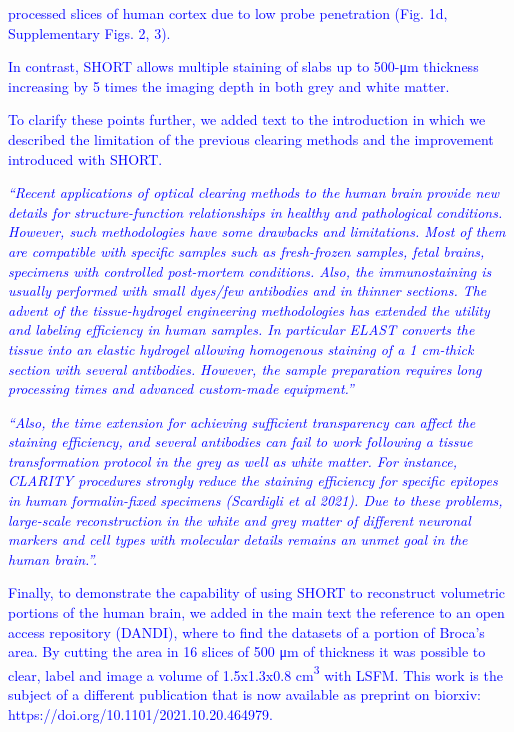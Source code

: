 \documentclass{article}
\newcommand{\reply}[1]{\textcolor{blue}{#1}}
\begin{document}
\noindent {}\reply{processed slices of human cortex due to low probe penetration (Fig. 1d, Supplementary Figs. 2, 3).}

\noindent \reply{In contrast, SHORT allows multiple staining of slabs up to 500-μm thickness increasing by 5 times} \reply{the imaging depth in both grey and white matter.}

\noindent \reply{To clarify these points further, we added text to the introduction in which we described the} \reply{limitation of the previous clearing methods and the improvement introduced with SHORT.}

\noindent \reply{\emph{“Recent applications of optical clearing methods to the human brain provide new details for}} \reply{\emph{structure-function relationships in healthy and pathological conditions. However, such}} \reply{\emph{methodologies have some drawbacks and limitations. Most of them are compatible with specific}} \reply{\emph{samples such as fresh-frozen samples, fetal brains, specimens with controlled post-mortem}} \reply{\emph{conditions. Also, the immunostaining is usually performed with small dyes/few antibodies and in}} \reply{\emph{thinner sections. The advent of the tissue-hydrogel engineering methodologies has extended the}} \reply{\emph{utility and labeling efficiency in human samples. In particular ELAST converts the tissue into an}} \reply{\emph{elastic hydrogel allowing homogenous staining of a 1 cm-thick section with several antibodies.}} \reply{\emph{However, the sample preparation requires long processing times and advanced custom-made}} \reply{\emph{equipment.”}}

\noindent \reply{\emph{“Also, the time extension for achieving sufficient transparency can affect the staining efficiency,}} \reply{\emph{and several antibodies can fail to work following a tissue transformation protocol in the grey as well}} \reply{\emph{as white matter. For instance, CLARITY procedures strongly reduce the staining efficiency for}} \reply{\emph{specific epitopes in human formalin-fixed specimens (Scardigli et al 2021). Due to these problems,}} \reply{\emph{large-scale reconstruction in the white and grey matter of different neuronal markers and cell types}} \reply{\emph{with molecular details remains an unmet goal in the human brain.”.}}

\noindent \reply{Finally, to demonstrate the capability of using SHORT to reconstruct volumetric portions of the} \reply{human brain, we added in the main text the reference to an open access repository (DANDI),} \reply{where to find the datasets of a portion of Broca’s area. By cutting the area in 16 slices of 500 μm of} \reply{thickness it was possible to clear, label and image a volume of 1.5x1.3x0.8 cm}\reply{\textsuperscript{3}} \reply{with LSFM. This} \reply{work is the subject of a different publication that is now available as preprint on biorxiv:} \reply{https://doi.org/10.1101/2021.10.20.464979.}
\end{document}
